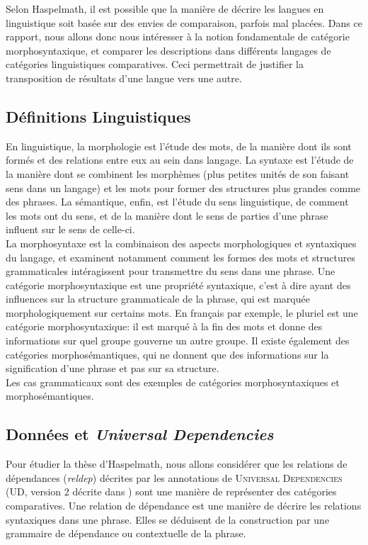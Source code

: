 \documentclass{cours}
\begin{document}
Selon Haspelmath, il est possible que la manière de décrire les langues en linguistique soit basée sur des envies de comparaison, parfois mal placées.
Dans ce rapport, nous allons donc nous intéresser à la notion fondamentale de catégorie morphosyntaxique, et comparer les descriptions dans différents langages de catégories linguistiques comparatives.
Ceci permettrait de justifier la transposition de résultats d'une langue vers une autre.

\subsection{Définitions Linguistiques}\label{subsec:linguistique}
En linguistique, la morphologie est l'étude des mots, de la manière dont ils sont formés et des relations entre eux au sein dans langage.
La syntaxe est l'étude de la manière dont se combinent les morphèmes (plus petites unités de son faisant sens dans un langage) et les mots pour former des structures plus grandes comme des phrases.
La sémantique, enfin, est l'étude du sens linguistique, de comment les mots ont du sens, et de la manière dont le sens de parties d'une phrase influent sur le sens de celle-ci.\\
\medskip
La morphosyntaxe est la combinaison des aspects morphologiques et syntaxiques du langage, et examinent notamment comment les formes des mots et structures grammaticales intéragissent pour transmettre du sens dans une phrase.
Une catégorie morphosyntaxique est une propriété syntaxique, c'est à dire ayant des influences sur la structure grammaticale de la phrase, qui est marquée morphologiquement sur certains mots.
En français par exemple, le pluriel est une catégorie morphosyntaxique: il est marqué à la fin des mots et donne des informations sur quel groupe gouverne un autre groupe.
Il existe également des catégories morphosémantiques, qui ne donnent que des informations sur la signification d'une phrase et pas sur sa structure.\\
\medskip
Les cas grammaticaux sont des exemples de catégories morphosyntaxiques et morphosémantiques.

\subsection{Données et \emph{Universal Dependencies}}\label{subsec:données}
Pour étudier la thèse d'Haspelmath, nous allons considérer que les relations de dépendances (\textit{reldep}) décrites par les annotations de \textsc{Universal Dependencies} (UD, version 2 décrite dans \cite{UDv2}) sont une manière de représenter des catégories comparatives.
Une relation de dépendance est une manière de décrire les relations syntaxiques dans une phrase.
Elles se déduisent de la construction par une grammaire de dépendance ou contextuelle de la phrase.
\end{document}
